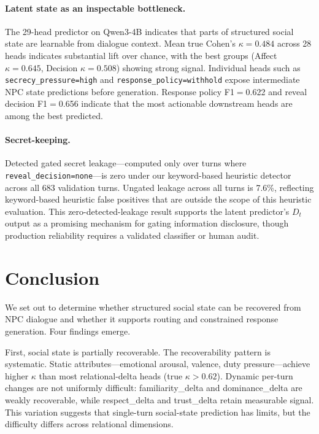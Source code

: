\documentclass[11pt]{article}
\begin{document}
\paragraph{Latent state as an inspectable bottleneck.}
The 29-head predictor on Qwen3-4B indicates that parts of structured social state are learnable from dialogue context.
Mean true Cohen's $\kappa=0.484$ across 28 heads indicates substantial lift over chance, with the best groups (Affect $\kappa=0.645$, Decision $\kappa=0.508$) showing strong signal.
Individual heads such as \texttt{secrecy\_pressure=high} and \texttt{response\_policy=withhold} expose intermediate NPC state predictions before generation.
Response policy F1$=$0.622 and reveal decision F1$=$0.656 indicate that the most actionable downstream heads are among the best predicted.

\paragraph{Secret-keeping.}
Detected gated secret leakage---computed only over turns where \texttt{reveal\_decision=none}---is zero under our keyword-based heuristic detector across all 683 validation turns.
Ungated leakage across all turns is 7.6\%, reflecting keyword-based heuristic false positives that are outside the scope of this heuristic evaluation.
This zero-detected-leakage result supports the latent predictor's $D_t$ output as a promising mechanism for gating information disclosure, though production reliability requires a validated classifier or human audit.

\section{Conclusion}
\label{sec:conclusion}

We set out to determine whether structured social state can be recovered from NPC dialogue and whether it supports routing and constrained response generation.
Four findings emerge.

First, social state is partially recoverable. The recoverability pattern is systematic.
Static attributes---emotional arousal, valence, duty pressure---achieve higher $\kappa$ than most relational-delta heads (true $\kappa{>}0.62$).
Dynamic per-turn changes are not uniformly difficult: familiarity\_delta and dominance\_delta are weakly recoverable, while respect\_delta and trust\_delta retain measurable signal.
This variation suggests that single-turn social-state prediction has limits, but the difficulty differs across relational dimensions.
\end{document}
